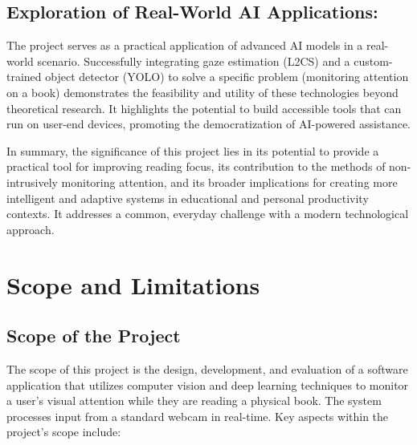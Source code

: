 \subsection{Exploration of Real-World AI Applications:}
The project serves as a practical application of advanced AI models in a real-world scenario. Successfully integrating gaze estimation (L2CS) and a custom-trained object detector (YOLO) to solve a specific problem (monitoring attention on a book) demonstrates the feasibility and utility of these technologies beyond theoretical research. It highlights the potential to build accessible tools that can run on user-end devices, promoting the democratization of AI-powered assistance.


In summary, the significance of this project lies in its potential to provide a practical tool for improving reading focus, its contribution to the methods of non-intrusively monitoring attention, and its broader implications for creating more intelligent and adaptive systems in educational and personal productivity contexts. It addresses a common, everyday challenge with a modern technological approach.

\section{Scope and Limitations}
\subsection{Scope of the Project}
The scope of this project is the design, development, and evaluation of a software application that utilizes computer vision and deep learning techniques to monitor a user's visual attention while they are reading a physical book. The system processes input from a standard webcam in real-time. Key aspects within the project's scope include:

